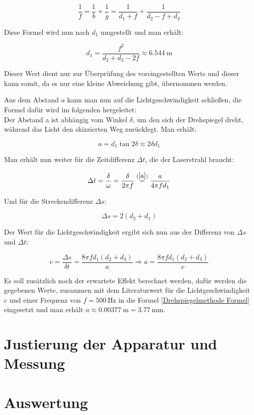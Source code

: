 \begin{equation}
    \frac{1}{f} = \frac{1}{b} + \frac{1}{g} = \frac{1}{d_1 + f} + \frac{1}{d_2 - f + d_3}
\end{equation}

Diese Formel wird nun nach $d_1$ umgestellt und man erhält:

\begin{equation}
    d_1 = \frac{f^2}{d_2+d_3-2f} \approx \SI{6.544}{\metre}
\end{equation}

Dieser Wert dient nur zur Überprüfung des voreingestellten Werts und dieser kann somit, da es nur eine kleine Abweichung gibt, übernommen werden.

Aus dem Abstand $a$ kann man nun auf die Lichtgeschwindigkeit schließen, die Formel dafür wird im folgenden hergeleitet:\\
Der Abstand a ist abhängig vom Winkel $\delta$, um den sich der Drehspiegel dreht, während das Licht den skizzierten Weg zurücklegt. Man erhält:

\begin{equation} \label{a}
    a = d_1 \tan{2\delta} \approx 2\delta d_1
\end{equation}

Man erhält nun weiter für die Zeitdifferenz $\Delta t$, die der Laserstrahl braucht:

\begin{equation}
    \Delta t = \frac{\delta}{\omega} = \frac{\delta}{2\pi f} \stackrel{(\ref{a})}{=} \frac{a}{4\pi f d_1}
\end{equation}

Und für die Streckendifferenz $\Delta s$:

\begin{equation}
    \Delta s = 2(d_2 + d_1)
\end{equation}

Der Wert für die Lichtgeschwindigkeit ergibt sich nun aus der Differenz von $\Delta s$ und $\Delta t$:

\begin{equation} \label{Drehspiegelmethode Formel}
    c = \frac{\Delta s}{\delta t} = \frac{8\pi f d_1 ( d_2 + d_3)}{a}
    \Rightarrow a = \frac{8 \pi f d_1 (d_2 + d_3)}{c}
\end{equation}

Es soll zusätzlich noch der erwartete Effekt berechnet werden, dafür werden die gegebenen Werte, zusammen mit dem Literaturwert für die Lichtgeschwindigkeit $c$ und einer Frequenz von $f = \SI{500}{\Hz}$ in die Formel \ref{Drehspiegelmethode Formel} eingesetzt und man erhält $a \approx \SI{0.00377}{\metre} = \SI{3.77}{\milli\metre}$.

\section{Justierung der Apparatur und Messung}


\section{Auswertung}